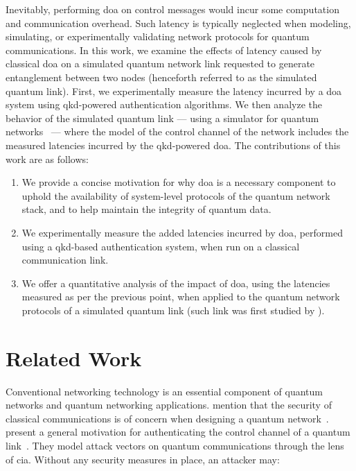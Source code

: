 Inevitably, performing \acrshort{doa} on control messages would incur some computation and
communication overhead. Such latency is typically neglected when modeling, simulating, or
experimentally validating network protocols for quantum communications. In this work, we examine the
effects of latency caused by classical \acrshort{doa} on a simulated quantum network link requested
to generate entanglement between two nodes (henceforth referred to as the simulated quantum link).
First, we experimentally measure the latency incurred by a \acrshort{doa} system using
\acrshort{qkd}-powered authentication algorithms. We then analyze the behavior of the simulated
quantum link --- using a simulator for quantum networks~\cite{coopmans_2021_netsquid} --- where the
model of the control channel of the network includes the measured latencies incurred by the
\acrshort{qkd}-powered \acrshort{doa}. The contributions of this work are as follows:

\begin{enumerate}
    \item We provide a concise motivation for why \acrshort{doa} is a necessary component to uphold
          the availability of system-level protocols of the quantum network stack, and to help
          maintain the integrity of quantum data.
    \item We experimentally measure the added latencies incurred by \acrshort{doa}, performed using
          a \acrshort{qkd}-based authentication system, when run on a classical communication link.
    \item We offer a quantitative analysis of the impact of \acrshort{doa}, using the latencies
          measured as per the previous point, when applied to the quantum network protocols of a
          simulated quantum link (such link was first studied by \textcite{dahlberg_2019_egp}).
\end{enumerate}

\section{Related Work}
\label{sec:doa:relwork}

Conventional networking technology is an essential component of quantum networks and quantum
networking applications. \citeauthor{kozlowski_2019_towards} mention that the security of classical
communications is of concern when designing a quantum network~\cite{kozlowski_2019_towards}.
\citeauthor{satoh_2020_attacking} present a general motivation for authenticating the control
channel of a quantum link~\cite{satoh_2020_attacking}. They model attack vectors on quantum
communications through the lens of \acrfull{cia}. Without any security measures in place, an
attacker may:

